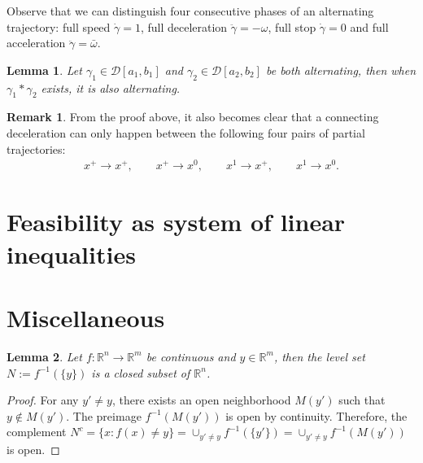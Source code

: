 \documentclass[a4paper]{article}
\theoremstyle{definition}
\newtheorem{remark}{Remark}
\theoremstyle{plain}
\newtheorem{lemma}{Lemma\hspace{0.25em}\ignorespaces}
\begin{document}
Observe that we can distinguish four consecutive phases of an alternating
trajectory: full speed $\dot{\gamma} = 1$, full deceleration
$\ddot{\gamma} = -\omega$, full stop $\dot{\gamma} = 0$ and full acceleration
$\ddot{\gamma} = \bar{\omega}$.

\begin{lemma}
  Let $\gamma_{1} \in \mathcal{D}[a_{1}, b_{1}]$ and $\gamma_{2} \in \mathcal{D}[a_{2}, b_{2}]$ be both alternating, then when $\gamma_{1} * \gamma_{2}$ exists, it is also alternating.
\end{lemma}

\begin{remark}
  From the proof above, it also becomes clear that a connecting deceleration can only happen between the following four pairs of partial trajectories:
  \begin{align*}
     x^{+} \rightarrow x^{+} , \quad \quad
     x^{+} \rightarrow x^{0} , \quad \quad
     x^{1} \rightarrow x^{+} , \quad \quad
     x^{1} \rightarrow x^{0} .
  \end{align*}
\end{remark}

\section{Feasibility as system of linear inequalities}




\newpage
\appendix
\section{Miscellaneous}

\begin{lemma}\label{lemma:levelset}
  Let $f :\mathbb{R}^{n} \rightarrow \mathbb{R}^{m}$ be continuous and
  $y \in \mathbb{R}^{m}$, then the level set $N := f^{-1}(\{ y \})$ is a closed
  subset of $\mathbb{R}^{n}$.
\end{lemma}
\begin{proof}
  For any $y' \neq y$, there exists an open neighborhood $M(y')$ such that
  $y \notin M(y')$. The preimage $f^{-1}(M(y'))$ is open by continuity.
  Therefore, the complement
  $N^{c} = \{ x : f(x) \neq y \} = \cup_{y' \neq y} f^{-1}(\{y'\}) = \cup_{y' \neq y} f^{-1}(M(y'))$
  is open.
\end{proof}
\end{document}

